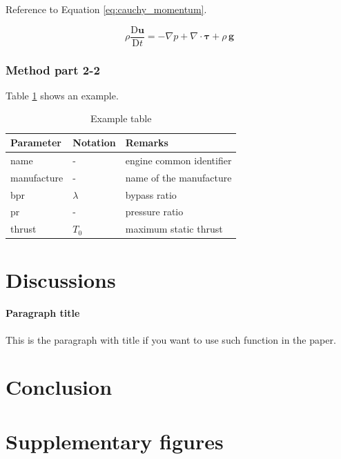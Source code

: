 \documentclass[
  manuscript=proceedings,  %
  layout=preprint,  %
  year=20xx,
  volume=x,
]{extra/joas}
\begin{document}
\blindtext Reference to Equation \ref{eq:cauchy_momentum}.

\begin{equation} \label{eq:cauchy_momentum}
\rho\frac{\mathrm{D} \mathbf{u}}{\mathrm{D} t} = - \nabla p + \nabla \cdot \boldsymbol \tau + \rho\,\mathbf{g}
\end{equation}


\subsubsection{Method part 2-2}

\blindtext Table \ref{tb:example_table} shows an example.

\begin{table}[H]
  \centering
  \small
  \caption{Example table}
  \label{tb:example_table}
  \begin{tabular}{lll}
  \toprule
  \textbf{Parameter} & \textbf{Notation} & \textbf{Remarks} \\
  \midrule
  name & - & engine common identifier \\
  manufacture & - & name of the manufacture  \\
  bpr & $\lambda$ & bypass ratio \\
  pr & - & pressure ratio \\
  thrust & $T_0$ & maximum static thrust\\
  \bottomrule
  \end{tabular}
\end{table}

\blindtext


\section{Discussions}

\paragraph{Paragraph title} This is the paragraph with title if you want to use such function in the paper. \blindtext


\section{Conclusion}

\blindtext


\appendix

\section{Supplementary figures}
\blindtext
\end{document}
